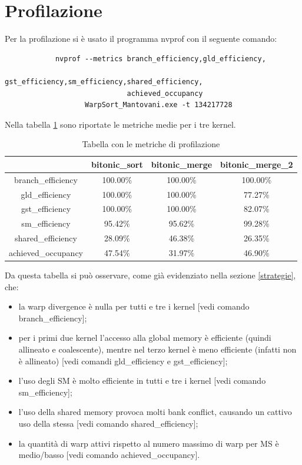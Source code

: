 \documentclass[a4paper, 11pt]{article}
\begin{document}
	\section{Profilazione}
		Per la profilazione si è usato il programma nvprof con il seguente comando:		
		\begin{verbatim}
			nvprof --metrics branch_efficiency,gld_efficiency,
			                 gst_efficiency,sm_efficiency,shared_efficiency, 
			                 achieved_occupancy 
			       WarpSort_Mantovani.exe -t 134217728
		\end{verbatim}		
		Nella tabella \ref{tab:prof} sono riportate le metriche medie per i tre kernel.
		\begin{table}[h]			
			\centering
			\begin{tabular}{c|ccc}
								    & bitonic\_sort & bitonic\_merge & bitonic\_merge\_2 \\
		        \hline
				branch\_efficiency  & 100.00\%      & 100.00\%       & 100.00\%          \\
				gld\_efficiency     & 100.00\%      & 100.00\%       &  77.27\%          \\
				gst\_efficiency     & 100.00\%      & 100.00\%       &  82.07\%          \\
				sm\_efficiency      &  95.42\%      &  95.62\%       &  99.28\%          \\
				shared\_efficiency  &  28.09\%      &  46.38\%       &  26.35\%          \\
				achieved\_occupancy &  47.54\%      &  31.97\%       &  46.90\%          \\
			\end{tabular}
			\caption{Tabella con le metriche di profilazione}
			\label{tab:prof}
		\end{table}
		Da questa tabella si può osservare, come già evidenziato nella sezione \ref{strategie}, che:
		\begin{itemize}
			\item la warp divergence è nulla per tutti e tre i kernel [vedi comando branch\_efficiency];
			\item per i primi due kernel l'accesso alla global memory è efficiente (quindi allineato e coalescente), 
				mentre nel terzo kernel è meno efficiente (infatti non è allineato) [vedi comandi gld\_efficiency e gst\_efficiency];
			\item l'uso degli SM è molto efficiente in tutti e tre i kernel [vedi comando sm\_efficiency];
			\item l'uso della shared memory provoca molti bank conflict, causando un cattivo uso della stessa [vedi comando shared\_efficiency];
			\item la quantità di warp attivi rispetto al numero massimo di warp per MS è medio/basso [vedi comando achieved\_occupancy].
		\end{itemize}
		
\end{document}
